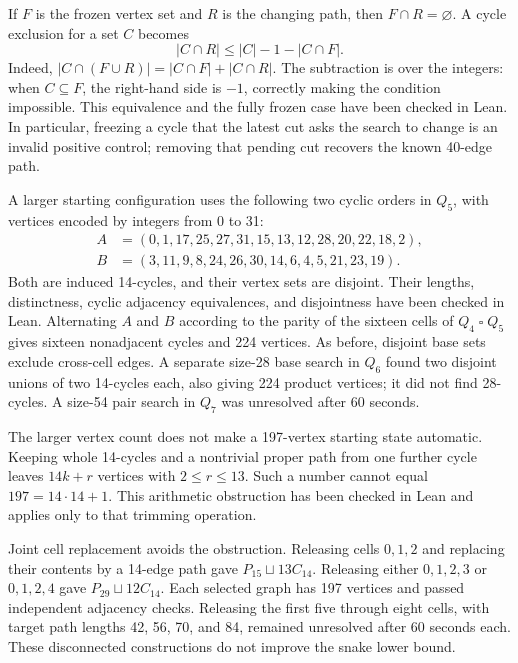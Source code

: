 \documentclass[11pt,a4paper]{article}
\theoremstyle{definition}
\theoremstyle{remark}
\newcommand{\Q}{Q}
\begin{document}
If $F$ is the frozen vertex set and $R$ is the changing path, then $F\cap R=\varnothing$. A cycle exclusion for a set $C$ becomes
\[
|C\cap R|\le |C|-1-|C\cap F|.
\]
Indeed, $|C\cap(F\cup R)|=|C\cap F|+|C\cap R|$. The subtraction is over the integers: when $C\subseteq F$, the right-hand side is $-1$, correctly making the condition impossible. This equivalence and the fully frozen case have been checked in Lean. In particular, freezing a cycle that the latest cut asks the search to change is an invalid positive control; removing that pending cut recovers the known 40-edge path.

A larger starting configuration uses the following two cyclic orders in $\Q_5$, with vertices encoded by integers from 0 to 31:
\[
\begin{aligned}
A&=(0,1,17,25,27,31,15,13,12,28,20,22,18,2),\\
B&=(3,11,9,8,24,26,30,14,6,4,5,21,23,19).
\end{aligned}
\]
Both are induced 14-cycles, and their vertex sets are disjoint. Their lengths, distinctness, cyclic adjacency equivalences, and disjointness have been checked in Lean. Alternating $A$ and $B$ according to the parity of the sixteen cells of $\Q_4\mathbin{\square}\Q_5$ gives sixteen nonadjacent cycles and 224 vertices. As before, disjoint base sets exclude cross-cell edges. A separate size-28 base search in $\Q_6$ found two disjoint unions of two 14-cycles each, also giving 224 product vertices; it did not find 28-cycles. A size-54 pair search in $\Q_7$ was unresolved after 60 seconds.

The larger vertex count does not make a 197-vertex starting state automatic. Keeping whole 14-cycles and a nontrivial proper path from one further cycle leaves $14k+r$ vertices with $2\le r\le13$. Such a number cannot equal $197=14\cdot14+1$. This arithmetic obstruction has been checked in Lean and applies only to that trimming operation.

Joint cell replacement avoids the obstruction. Releasing cells $0,1,2$ and replacing their contents by a 14-edge path gave $P_{15}\sqcup13C_{14}$. Releasing either $0,1,2,3$ or $0,1,2,4$ gave $P_{29}\sqcup12C_{14}$. Each selected graph has 197 vertices and passed independent adjacency checks. Releasing the first five through eight cells, with target path lengths 42, 56, 70, and 84, remained unresolved after 60 seconds each. These disconnected constructions do not improve the snake lower bound.
\end{document}
